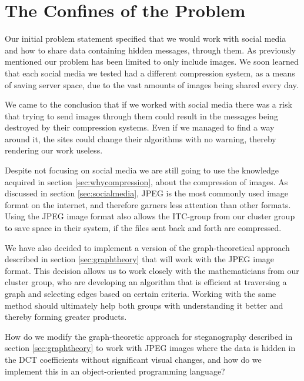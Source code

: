 \section{The Confines of the Problem}
\label{sec:confines}
Our initial problem statement specified that we would work with social media and how to share data containing hidden messages, through them.
As previously mentioned our problem has been limited to only include images.
We soon learned that each social media we tested had a different compression system, as a means of saving server space, due to the vast amounts of images being shared every day.

We came to the conclusion that if we worked with social media there was a risk that trying to send images through them could result in the messages being destroyed by their compression systems.
Even if we managed to find a way around it, the sites could change their algorithms with no warning, thereby rendering our work useless.

Despite not focusing on social media we are still going to use the knowledge acquired in section \ref{sec:whycompression}, about the compression of images.
As discussed in section \ref{sec:socialmedia}, JPEG is the most commonly used image format on the internet, and therefore garners less attention than other formats.
Using the JPEG image format also allows the ITC-group from our cluster group to save space in their system, if the files sent back and forth are compressed.

We have also decided to implement a version of the graph-theoretical approach described in section \ref{sec:graphtheory} that will work with the JPEG image format.
This decision allows us to work closely with the mathematicians from our cluster group, who are developing an algorithm that is efficient at traversing a graph and selecting edges based on certain criteria.
Working with the same method should ultimately help both groups with understanding it better and thereby forming greater products.

\vspace{5mm}
\begin{centering}
	\begin{tcolorbox}[center title, title=Problem Statement, width=.8\textwidth]
How do we modify the graph-theoretic approach for steganography described in section \ref{sec:graphtheory} to work with JPEG images where the data is hidden in the DCT coefficients without significant visual changes, and how do we implement this in an object-oriented programming language?
	\end{tcolorbox}
\end{centering}

